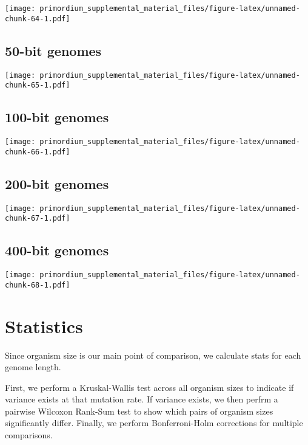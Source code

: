 \documentclass[]{book}
\begin{document}
\texttt{[image: primordium\_supplemental\_material\_files/figure-latex/unnamed-chunk-64-1.pdf]}

\hypertarget{bit-genomes-1}{%
\subsection{50-bit genomes}\label{bit-genomes-1}}

\texttt{[image: primordium\_supplemental\_material\_files/figure-latex/unnamed-chunk-65-1.pdf]}

\hypertarget{bit-genomes-2}{%
\subsection{100-bit genomes}\label{bit-genomes-2}}

\texttt{[image: primordium\_supplemental\_material\_files/figure-latex/unnamed-chunk-66-1.pdf]}

\hypertarget{bit-genomes-3}{%
\subsection{200-bit genomes}\label{bit-genomes-3}}

\texttt{[image: primordium\_supplemental\_material\_files/figure-latex/unnamed-chunk-67-1.pdf]}

\hypertarget{bit-genomes-4}{%
\subsection{400-bit genomes}\label{bit-genomes-4}}

\texttt{[image: primordium\_supplemental\_material\_files/figure-latex/unnamed-chunk-68-1.pdf]}

\hypertarget{statistics-2}{%
\section{Statistics}\label{statistics-2}}

Since organism size is our main point of comparison, we calculate stats for each genome length.

First, we perform a Kruskal-Wallis test across all organism sizes to indicate if variance exists at that mutation rate.
If variance exists, we then perfrm a pairwise Wilcoxon Rank-Sum test to show which pairs of organism sizes significantly differ.
Finally, we perform Bonferroni-Holm corrections for multiple comparisons.
\end{document}
